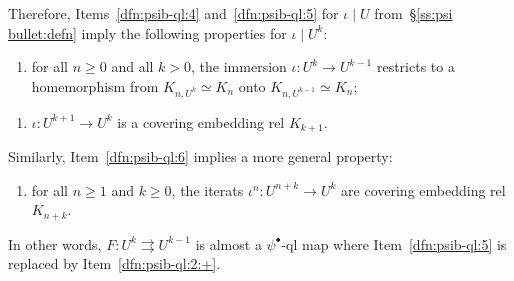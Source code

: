 \documentclass{amsart}
\newcommand{\1}{{\mathbb 1 }}
\theoremstyle{remark}
\numberwithin{equation}{section}
\theoremstyle{definition}
\begin{document}
Therefore, Items~\ref{dfn:psib-ql:4} and~\ref{dfn:psib-ql:5} for $\iota\mid U$ from~\S\ref{ss:psi bullet:defn} imply the following properties for $\iota\mid U^k$:
\begin{enumerate}[label=\text{(\Roman*${}^k$)},font=\normalfont,leftmargin=*,start =4]

\item  \label{dfn:psib-ql:4:4} for all $n\ge 0$ and all $k>0$, the immersion $\iota\colon U^k\to U^{k-1}$ restricts to a homemorphism from $K_{n, U^k} \simeq K_n$ onto $K_{n, U^{k-1}}\simeq K_n$;
\end{enumerate}
\begin{enumerate}[label=\text{(\Roman*${}^k$)},font=\normalfont,leftmargin=*,start =5]
\item \label{dfn:psib-ql:2:+} $\iota\colon U^{k+1}\to U^{k}$ is a covering embedding rel $K_{k+1}$.
\end{enumerate}
Similarly, Item~\ref{dfn:psib-ql:6} implies a more general property:
\begin{enumerate}[label=\text{(\Roman*${}^k$)},font=\normalfont,leftmargin=*,start =6]
\item \label{dfn:psib-ql:6:+} for all $n\ge 1$ and $k\ge 0$, the iterats $\iota^n\colon U^{n+k}\to U^{k}$ are covering embedding rel $K_{n+k}$.
\end{enumerate}
In other words,  $F\colon U^k\rightrightarrows  U^{k-1}$ is almost a $\psi^\bullet$-ql map where Item~\ref{dfn:psib-ql:5} is replaced by Item~\ref{dfn:psib-ql:2:+}.
\end{document}
